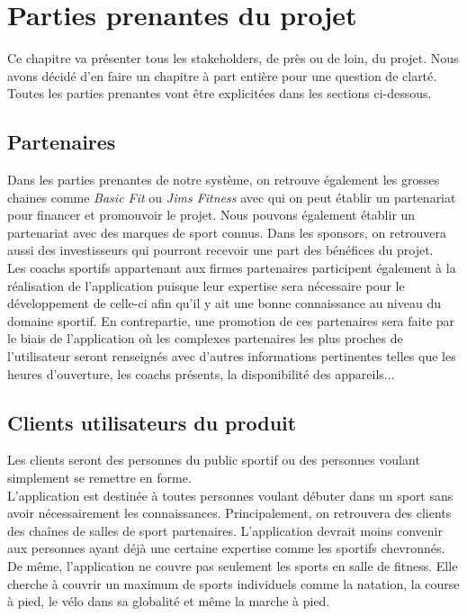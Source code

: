 \chapter{Parties prenantes du projet}

Ce chapitre va présenter tous les stakeholders, de près ou de loin, du projet. Nous avons décidé d'en faire un chapitre à part entière pour une question de clarté. Toutes les parties prenantes vont être explicitées dans les sections ci-dessous.

\section{Partenaires}

Dans les parties prenantes de notre système, on retrouve également les grosses chaines comme \textit{Basic Fit} ou \textit{Jims Fitness} avec qui on peut établir un partenariat pour financer et promouvoir le projet. Nous pouvons également établir un partenariat avec des marques de sport connus. Dans les sponsors, on retrouvera aussi des investisseurs qui pourront recevoir une part des bénéfices du projet.\\ 
Les coachs sportifs appartenant aux firmes partenaires participent également à la réalisation de l'application puisque leur expertise sera nécessaire pour le développement de celle-ci afin qu'il y ait une bonne connaissance au niveau du domaine sportif. En contrepartie, une promotion de ces partenaires sera faite par le biais de l'application où les complexes partenaires les plus proches de l'utilisateur seront renseignés avec d'autres informations pertinentes telles que les heures d'ouverture, les coachs présents, la disponibilité des appareils...

\section{Clients utilisateurs du produit}

Les clients seront des personnes du public sportif ou des personnes voulant simplement se remettre en forme.\\

L'application est destinée à toutes personnes voulant débuter dans un sport sans avoir nécessairement les connaissances. Principalement, on retrouvera des clients des chaînes de salles de sport partenaires. L'application devrait moins convenir aux personnes ayant déjà une certaine expertise comme les sportifs chevronnés. De même, l'application ne couvre pas seulement les sports en salle de fitness. Elle cherche à couvrir un maximum de sports individuels comme la natation, la course à pied, le vélo dans sa globalité et même la marche à pied.

